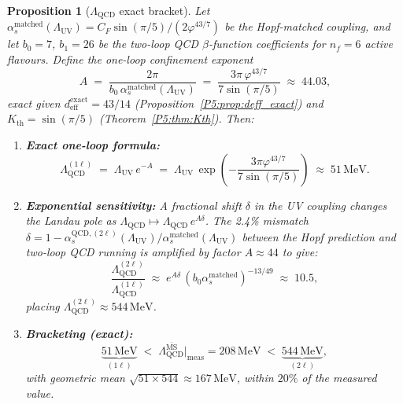 \documentclass[11pt,a4paper]{article}
\newtheorem{proposition}[theorem]{Proposition}
\theoremstyle{definition}
\theoremstyle{remark}
\newcommand{\vp}{\varphi}
\newcommand{\LUV}{\Lambda_{\mathrm{UV}}}
\newcommand{\LQCD}{\Lambda_{\mathrm{QCD}}}
\begin{document}
\begin{proposition}[$\Lambda_{\mathrm{QCD}}$ exact bracket]
\label{P5:prop:lqcd_bracket}
Let $\alpha_s^{\mathrm{matched}}(\LUV)=C_F\sin(\pi/5)/(2\vp^{43/7})$
be the Hopf-matched coupling, and let $b_0=7$, $b_1=26$ be the
two-loop QCD $\beta$-function coefficients for $n_f=6$ active flavours.
Define the one-loop confinement exponent
\begin{equation}
  A \;=\; \frac{2\pi}{b_0\,\alpha_s^{\mathrm{matched}}(\LUV)}
  \;=\; \frac{3\pi\,\vp^{43/7}}{7\sin(\pi/5)}
  \;\approx\; 44.03,
  \label{P5:eq:A_exponent}
\end{equation}
exact given $d_{\mathrm{eff}}^{\mathrm{exact}}=43/14$
(Proposition~\ref{P5:prop:deff_exact}) and $K_{\mathrm{th}}=\sin(\pi/5)$
(Theorem~\ref{P5:thm:Kth}).
Then:
\begin{enumerate}[label=(\roman*)]
\item \textbf{Exact one-loop formula:}
\begin{equation}
  \LQCD^{(1\ell)}
  \;=\; \LUV\,e^{-A}
  \;=\; \LUV\,\exp\!\left(-\frac{3\pi\vp^{43/7}}{7\sin(\pi/5)}\right)
  \;\approx\; 51\,\mathrm{MeV}.
  \label{P5:eq:lqcd_1l_exact}
\end{equation}
\item \textbf{Exponential sensitivity:}
A fractional shift $\delta$ in the UV coupling changes the Landau pole
as $\LQCD \mapsto \LQCD\,e^{A\delta}$.  The 2.4\% mismatch
$\delta = 1 - \alpha_s^{\mathrm{QCD},(2\ell)}(\LUV)/\alpha_s^{\mathrm{matched}}(\LUV)$
between the Hopf prediction and two-loop QCD running
is amplified by factor $A\approx44$ to give:
\begin{equation}
  \frac{\LQCD^{(2\ell)}}{\LQCD^{(1\ell)}}
  \;\approx\; e^{A\delta}\,(b_0\alpha_s^{\mathrm{matched}})^{-13/49}
  \;\approx\; 10.5,
  \label{P5:eq:loop_ratio}
\end{equation}
placing $\LQCD^{(2\ell)}\approx544\,\mathrm{MeV}$.
\item \textbf{Bracketing (exact):}
\begin{equation}
  \underbrace{51\,\mathrm{MeV}}_{(1\ell)}
  \;<\; \LQCD^{\overline{\mathrm{MS}}}\big|_{\mathrm{meas}} = 208\,\mathrm{MeV}
  \;<\; \underbrace{544\,\mathrm{MeV}}_{(2\ell)},
  \label{P5:eq:LQCD_bracket}
\end{equation}
with geometric mean $\sqrt{51\times544}\approx167\,\mathrm{MeV}$,
within $20\%$ of the measured value.
\end{enumerate}
\end{proposition}
\end{document}
